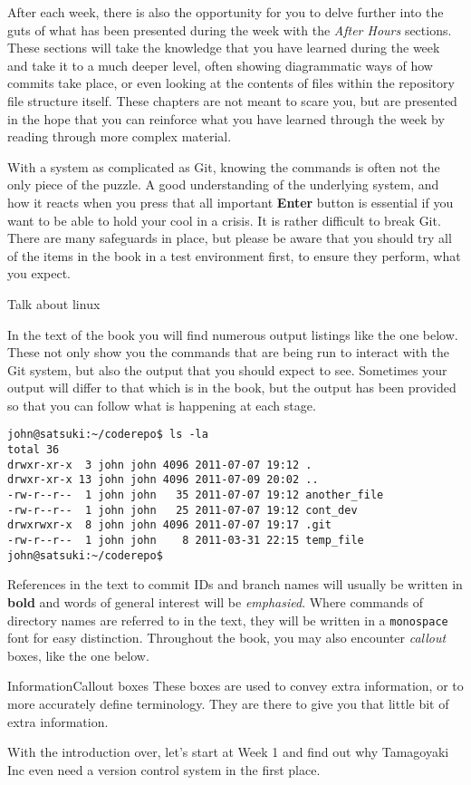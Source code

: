After each week, there is also the opportunity for you to delve further into the guts of what has been presented during the week with the \emph{After Hours} sections.  These sections will take the knowledge that you have learned during the week and take it to a much deeper level, often showing diagrammatic ways of how commits take place, or even looking at the contents of files within the repository file structure itself.  These chapters are not meant to scare you, but are presented in the hope that you can reinforce what you have learned through the week by reading through more complex material.

With a system as complicated as Git, knowing the commands is often not the only piece of the puzzle.  A good understanding of the underlying system, and how it reacts when you press that all important \textbf{Enter} button is essential if you want to be able to hold your cool in a crisis.  It is rather difficult to break Git.  There are many safeguards in place, but please be aware that you should try all of the items in the book in a test environment first, to ensure they perform, what you expect.  

Talk about linux

In the text of the book you will find numerous output listings like the one below.  These not only show you the commands that are being run to interact with the Git system, but also the output that you should expect to see.  Sometimes your output will differ to that which is in the book, but the output has been provided so that you can follow what is happening at each stage.

\begin{Verbatim}
john@satsuki:~/coderepo$ ls -la
total 36
drwxr-xr-x  3 john john 4096 2011-07-07 19:12 .
drwxr-xr-x 13 john john 4096 2011-07-09 20:02 ..
-rw-r--r--  1 john john   35 2011-07-07 19:12 another_file
-rw-r--r--  1 john john   25 2011-07-07 19:12 cont_dev
drwxrwxr-x  8 john john 4096 2011-07-07 19:17 .git
-rw-r--r--  1 john john    8 2011-03-31 22:15 temp_file
john@satsuki:~/coderepo$ 
\end{Verbatim}

References in the text to commit IDs and branch names will usually be written in \textbf{bold} and words of general interest will be \emph{emphasied}.  Where commands of directory names are referred to in the text, they will be written in a \texttt{monospace} font for easy distinction.  Throughout the book, you may also encounter \emph{callout} boxes, like the one below.  

\begin{callout}{Information}{Callout boxes}
These boxes are used to convey extra information, or to more accurately define terminology.  They are there to give you that little bit of extra information.
\end{callout}

With the introduction over, let's start at Week 1 and find out why Tamagoyaki Inc even need a version control system in the first place.
